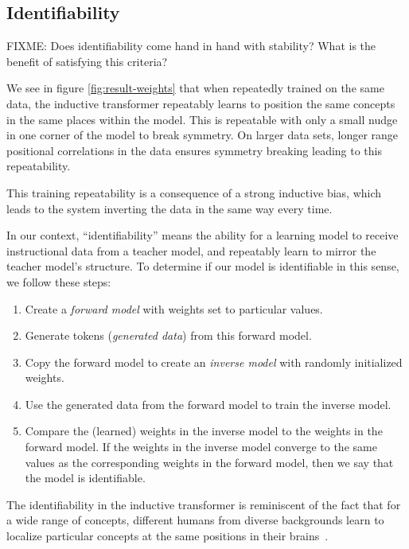 \documentclass{article}
\begin{document}
\subsection{Identifiability}

FIXME: Does identifiability come hand in hand with stability? What is the benefit of satisfying this criteria?

We see in figure \ref{fig:result-weights} that when repeatedly trained on the same data, the inductive transformer repeatably learns to position the same concepts in the same places within the model. This is repeatable with only a small nudge in one corner of the model to break symmetry. On larger data sets, longer range positional correlations in the data ensures symmetry breaking leading to this repeatability.  

This training repeatability is a consequence of a strong inductive bias, which leads to the system inverting the data in the same way every time.

In our context, ``identifiability'' means the ability for a learning model to receive instructional data from a teacher model, and repeatably learn to mirror the teacher model's structure.  To determine if our model is identifiable in this sense, we follow these steps:

\begin{enumerate}
    \itemsep -0.25em 
    \item Create a \emph{forward model} with weights set to particular values.
    \item Generate tokens (\emph{generated data}) from this forward model.
    \item Copy the forward model to create an \emph{inverse model} with randomly initialized weights.
    \item Use the generated data from the forward model to train the inverse model.
    \item Compare the (learned) weights in the inverse model to the weights in the forward model.  If the weights in the inverse model converge to the same values as the corresponding weights in the forward model, then we say that the model is identifiable.
\end{enumerate}

The identifiability in the inductive transformer is reminiscent of the fact that for a wide range of concepts, different humans from diverse backgrounds learn to localize particular concepts at the same positions in their brains~\citep{DBLP:journals/nature/HuthHGTG16, li2023large, geva-etal-2021-transformer, merlin2022language}.
\end{document}

